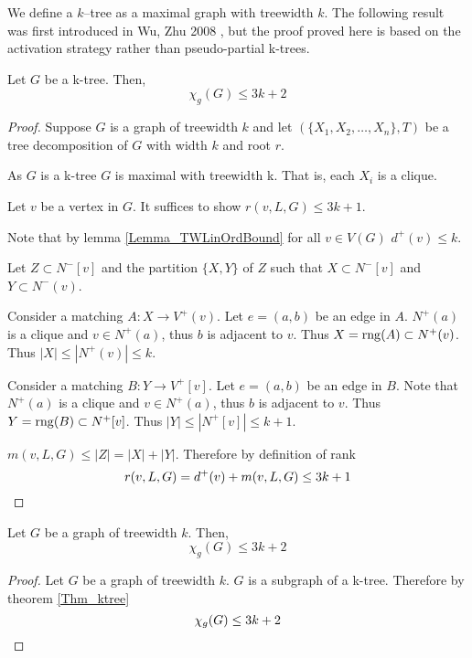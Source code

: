 
We define a $k$--tree as a maximal graph with treewidth $k$. The following result was first introduced in Wu, Zhu 2008 \cite{WuZhu2008}, but the proof proved here is based on the activation strategy rather than pseudo-partial k-trees.
\begin{theorem} \label{Thm_ktree}
        Let $G$ be a k-tree. Then, 
        \[\chi_g(G) \leq 3k + 2\]
\end{theorem}

\begin{proof}
    Suppose $G$ is a graph of treewidth $k$ and let $(\{X_1,X_2,\dots,X_n\},T)$ be a tree decomposition of $G$ with width $k$ and root $r$.
    
    As $G$ is a k-tree $G$ is maximal with treewidth k. That is, each $X_i$ is a clique.
    
    Let $v$ be a vertex in $G$. It suffices to show $r(v,L,G) \leq 3k + 1$.
    
    
    Note that by lemma \ref{Lemma_TWLinOrdBound} for all $v \in V(G)$ $d^+(v) \leq k$.
    
    Let $Z \subset N^-[v]$ and the partition $\{X,Y\}$ of $Z$ such that $X\subset N^-[v]$ and  $Y\subset N^-(v)$.
           
    Consider a matching $A\colon X \to V^+(v)$. Let $e=(a,b)$ be an edge in $A$.
    $N^+(a)$ is a clique and $v\in N^+(a)$, thus $b$ is adjacent to $v$. Thus $X =\operatorname{rng}(A)\subset N^+(v)$. Thus $|X| \leq |N^+(v)| \leq k$. 
    
    Consider a matching $B\colon Y \to V^+[v]$. Let $e=(a,b)$ be an edge in $B$.
    Note that $N^+(a)$ is a clique and $v\in N^+(a)$, thus $b$ is adjacent to $v$. Thus $Y =\operatorname{rng}(B)\subset N^+[v]$. Thus $|Y| \leq |N^+[v]| \leq k+1$. 
        
    $m(v,L,G) \leq |Z| = |X|+|Y|$. Therefore by definition of rank \[r(v,L,G) = d^+(v) + m(v,L,G) \leq 3k +1 \qedhere\]        
\end{proof}

\begin{corollary}
    Let $G$ be a graph of treewidth $k$. Then, 
    \[\chi_g(G) \leq 3k + 2\]
\end{corollary}

\begin{proof}
    Let $G$ be a graph of treewidth $k$.
    $G$ is a subgraph of a k-tree. Therefore by theorem \ref{Thm_ktree} \[\chi_g(G) \leq 3k + 2 \qedhere\] 
\end{proof}

